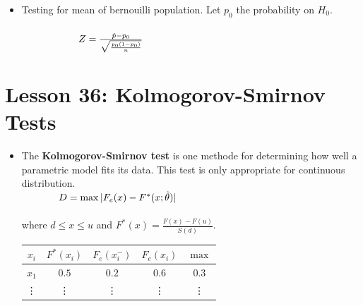 \documentclass[10pt, french]{article}
\begin{document}
\begin{multicols*}{3}
\begin{itemize}[align=left,leftmargin=*]
  \item Testing for mean of bernouilli population. Let $p_0$ the probability on $H_0$. \\ \\
  $\hspace*{2cm} Z = \frac{\hat{p} - p_0}{\sqrt{\frac{p_0(1-p_0)}{n}}}$
\end{itemize}

\section*{Lesson 36: Kolmogorov-Smirnov Tests}
\begin{itemize}[align=left,leftmargin=*]
  \item The \textbf{Kolmogorov-Smirnov test} is one methode for determining how well a parametric model fits its data. This test is only appropriate for continuous distribution.\\
  $\hspace*{1.3cm} D = \max|F_e(x) - F^*(x;\hat{\theta})|$ \\ \\
  where $d \leq x \leq u$ and $F^*(x) = \frac{F(x) - F(u)}{S(d)}$. \\
  \begin{tabular}{ccccc}
    \hline
    $x_i$ & $F^*(x_i)$ & $F_e(x_i^-)$ & $F_e(x_i)$ & $\max$ \\
    \hline
    $x_1$ & $0.5$ & $0.2$ & $0.6$ &  $0.3$ \\
    \vdots & \vdots & \vdots & \vdots & \vdots \\
    \hline
  \end{tabular}
\end{itemize}


\end{multicols*}
\end{document}

